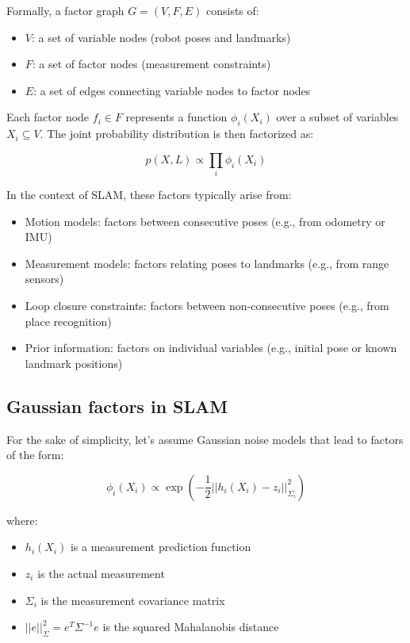 \documentclass[journal]{IEEEtran}
\begin{document}
Formally, a factor graph $G = (V, F, E)$ consists of:
\begin{itemize}
    \item $V$: a set of variable nodes (robot poses and landmarks)
    \item $F$: a set of factor nodes (measurement constraints)
    \item $E$: a set of edges connecting variable nodes to factor nodes
\end{itemize}

Each factor node $f_i \in F$ represents a function $\phi_i(X_i)$ over a subset of variables $X_i \subseteq V$. The joint probability distribution is then factorized as:

\begin{equation}
    p(X, L) \propto \prod_{i} \phi_i(X_i)
\end{equation}

In the context of SLAM, these factors typically arise from:
\begin{itemize}
    \item Motion models: factors between consecutive poses (e.g., from odometry or IMU)
    \item Measurement models: factors relating poses to landmarks (e.g., from range sensors)
    \item Loop closure constraints: factors between non-consecutive poses (e.g., from place recognition)
    \item Prior information: factors on individual variables (e.g., initial pose or known landmark positions)
\end{itemize}

\subsection{Gaussian factors in SLAM}

For the sake of simplicity, let's assume Gaussian noise models that lead to factors of the form:

\begin{equation}
    \phi_i(X_i) \propto \exp\left(-\frac{1}{2}||h_i(X_i) - z_i||^2_{\Sigma_i}\right)
\end{equation}

where:
\begin{itemize}
    \item $h_i(X_i)$ is a measurement prediction function
    \item $z_i$ is the actual measurement
    \item $\Sigma_i$ is the measurement covariance matrix
    \item $||e||^2_{\Sigma} = e^T \Sigma^{-1} e$ is the squared Mahalanobis distance
\end{itemize}
\end{document}
